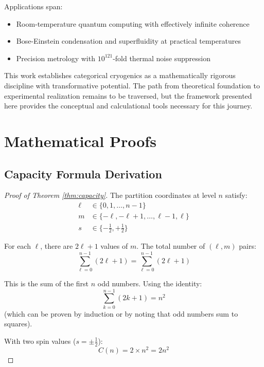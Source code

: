 Applications span:
\begin{itemize}
    \item Room-temperature quantum computing with effectively infinite coherence
    \item Bose-Einstein condensation and superfluidity at practical temperatures
    \item Precision metrology with $10^{121}$-fold thermal noise suppression
\end{itemize}

This work establishes categorical cryogenics as a mathematically rigorous discipline with transformative potential. The path from theoretical foundation to experimental realization remains to be traversed, but the framework presented here provides the conceptual and calculational tools necessary for this journey.


\section{Mathematical Proofs}

\subsection{Capacity Formula Derivation}

\begin{proof}[Proof of Theorem \ref{thm:capacity}]
The partition coordinates at level $n$ satisfy:
\begin{align}
\ell &\in \{0, 1, \ldots, n-1\} \\
m &\in \{-\ell, -\ell+1, \ldots, \ell-1, \ell\} \\
s &\in \{-\tfrac{1}{2}, +\tfrac{1}{2}\}
\end{align}

For each $\ell$, there are $2\ell + 1$ values of $m$. The total number of $(\ell, m)$ pairs:
\begin{equation}
\sum_{\ell=0}^{n-1} (2\ell + 1) = \sum_{\ell=0}^{n-1} (2\ell + 1)
\end{equation}

This is the sum of the first $n$ odd numbers. Using the identity:
\begin{equation}
\sum_{k=0}^{n-1} (2k + 1) = n^2
\end{equation}
(which can be proven by induction or by noting that odd numbers sum to squares).

With two spin values ($s = \pm\frac{1}{2}$):
\begin{equation}
C(n) = 2 \times n^2 = 2n^2
\end{equation}
\end{proof}

